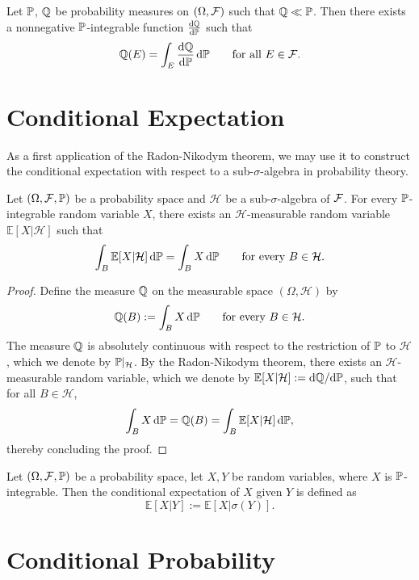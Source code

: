 \begin{theorem} 
	Let $\mathbb P$, $\mathbb Q$ be probability measures on $(\Omega,\mathcal F)$ such that $\mathbb Q\ll \mathbb P$. Then there exists a nonnegative $\mathbb P$-integrable function $\frac{\mathrm{d}\mathbb Q}{\mathrm{d}\mathbb P}$ such that
	\[
		\mathbb Q(E) = \int_E \frac{\mathrm{d}\mathbb Q}{\mathrm{d}\mathbb P}\,\mathrm{d}\mathbb P\qquad\text{for all $E\in\mathcal F$}.
	\]
\end{theorem}


\section{Conditional Expectation}

As a first application of the Radon-Nikodym theorem, we may use it to construct the conditional expectation with respect to a sub-$\sigma$-algebra in probability theory.

\begin{theorem}
Let $(\Omega, \mathcal F, \mathbb P)$ be a probability space and $\mathcal{H}$ be a sub-$\sigma$-algebra of $\mathcal F$. For every $\mathbb P$-integrable random variable $X$, there exists an $\mathcal{H}$-measurable random variable $\mathbb{E}[X|\mathcal{H}]$ such that
\[
\int_B \mathbb{E}[ X | \mathcal{H} ] \,\mathrm{d} \mathbb P = \int_B X\, \mathrm{d} \mathbb P\qquad\text{for every $B \in \mathcal{H}$}.
\]
\end{theorem}

\begin{proof}
Define the measure $\mathbb Q$ on the measurable space $(\Omega,\mathcal{H})$ by
\[
\mathbb Q(B) := \int_B X\, \mathrm{d} \mathbb P \qquad \text{for every  $B \in \mathcal{H}$}.
\]
The measure $\mathbb Q$ is absolutely continuous with respect to the restriction of $\mathbb P$ to $\mathcal{H}$, which we denote by $\mathbb P|_{\mathcal{H}}$.
By the Radon-Nikodym theorem, there exists an $\mathcal{H}$-measurable random variable, which we denote by $\mathbb{E}[X|\mathcal{H}] := \mathrm{d}\mathbb Q/\mathrm{d}\mathbb P$, such that for all $B \in \mathcal{H}$,
\[
\int_B X \,\mathrm{d} \mathbb P = \mathbb Q(B) = \int_B \mathbb{E}[X | \mathcal{H}] \,\mathrm{d} \mathbb P,
\]
thereby concluding the proof.
\end{proof}

\begin{definition}
Let $(\Omega, \mathcal F, \mathbb P)$ be a probability space, let $X,Y$ be random variables, where $X$ is $\mathbb P$-integrable. Then the conditional expectation of $X$ given $Y$ is defined as
\[
\mathbb{E}[X | Y] := \mathbb{E}[ X | \sigma(Y) ].
\]	
\end{definition}

\section{Conditional Probability}

